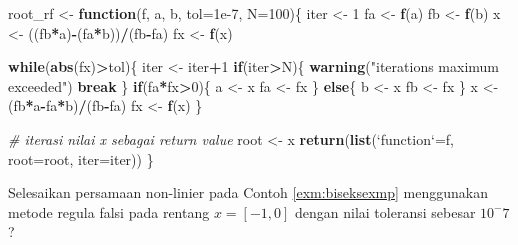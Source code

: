 \documentclass[]{book}
\newenvironment{Shaded}{\begin{snugshade}}{\end{snugshade}}
\newcommand{\CommentTok}[1]{\textcolor[rgb]{0.56,0.35,0.01}{\textit{#1}}}
\newcommand{\ControlFlowTok}[1]{\textcolor[rgb]{0.13,0.29,0.53}{\textbf{#1}}}
\newcommand{\DataTypeTok}[1]{\textcolor[rgb]{0.13,0.29,0.53}{#1}}
\newcommand{\DecValTok}[1]{\textcolor[rgb]{0.00,0.00,0.81}{#1}}
\newcommand{\FloatTok}[1]{\textcolor[rgb]{0.00,0.00,0.81}{#1}}
\newcommand{\KeywordTok}[1]{\textcolor[rgb]{0.13,0.29,0.53}{\textbf{#1}}}
\newcommand{\NormalTok}[1]{#1}
\newcommand{\OperatorTok}[1]{\textcolor[rgb]{0.81,0.36,0.00}{\textbf{#1}}}
\newcommand{\StringTok}[1]{\textcolor[rgb]{0.31,0.60,0.02}{#1}}
\theoremstyle{definition}
\theoremstyle{definition}
\theoremstyle{definition}
\theoremstyle{remark}
\let\BeginKnitrBlock\begin \let\EndKnitrBlock\end
\begin{document}
\begin{Shaded}
\begin{Highlighting}[]
\NormalTok{root_rf <-}\StringTok{ }\ControlFlowTok{function}\NormalTok{(f, a, b, }\DataTypeTok{tol=}\FloatTok{1e-7}\NormalTok{, }\DataTypeTok{N=}\DecValTok{100}\NormalTok{)\{}
\NormalTok{  iter <-}\StringTok{ }\DecValTok{1}
\NormalTok{  fa <-}\StringTok{ }\KeywordTok{f}\NormalTok{(a)}
\NormalTok{  fb <-}\StringTok{ }\KeywordTok{f}\NormalTok{(b)}
\NormalTok{  x <-}\StringTok{ }\NormalTok{((fb}\OperatorTok{*}\NormalTok{a)}\OperatorTok{-}\NormalTok{(fa}\OperatorTok{*}\NormalTok{b))}\OperatorTok{/}\NormalTok{(fb}\OperatorTok{-}\NormalTok{fa)}
\NormalTok{  fx <-}\StringTok{ }\KeywordTok{f}\NormalTok{(x)}
  
  \ControlFlowTok{while}\NormalTok{(}\KeywordTok{abs}\NormalTok{(fx)}\OperatorTok{>}\NormalTok{tol)\{}
\NormalTok{    iter <-}\StringTok{ }\NormalTok{iter}\OperatorTok{+}\DecValTok{1}
    \ControlFlowTok{if}\NormalTok{(iter}\OperatorTok{>}\NormalTok{N)\{}
      \KeywordTok{warning}\NormalTok{(}\StringTok{"iterations maximum exceeded"}\NormalTok{)}
      \ControlFlowTok{break}
\NormalTok{    \}}
    \ControlFlowTok{if}\NormalTok{(fa}\OperatorTok{*}\NormalTok{fx}\OperatorTok{>}\DecValTok{0}\NormalTok{)\{}
\NormalTok{      a <-}\StringTok{ }\NormalTok{x}
\NormalTok{      fa <-}\StringTok{ }\NormalTok{fx}
\NormalTok{    \} }\ControlFlowTok{else}\NormalTok{\{}
\NormalTok{      b <-}\StringTok{ }\NormalTok{x}
\NormalTok{      fb <-}\StringTok{ }\NormalTok{fx}
\NormalTok{    \}}
\NormalTok{    x <-}\StringTok{ }\NormalTok{(fb}\OperatorTok{*}\NormalTok{a}\OperatorTok{-}\NormalTok{fa}\OperatorTok{*}\NormalTok{b)}\OperatorTok{/}\NormalTok{(fb}\OperatorTok{-}\NormalTok{fa)}
\NormalTok{    fx <-}\StringTok{ }\KeywordTok{f}\NormalTok{(x)}
\NormalTok{  \}}
  
  \CommentTok{# iterasi nilai x sebagai return value}
\NormalTok{  root <-}\StringTok{ }\NormalTok{x}
  \KeywordTok{return}\NormalTok{(}\KeywordTok{list}\NormalTok{(}\StringTok{`}\DataTypeTok{function}\StringTok{`}\NormalTok{=f, }\DataTypeTok{root=}\NormalTok{root, }\DataTypeTok{iter=}\NormalTok{iter))}
\NormalTok{\}}
\end{Highlighting}
\end{Shaded}

\BeginKnitrBlock{example}
\protect\hypertarget{exm:rfexmp}{}{\label{exm:rfexmp} }Selesaikan persamaan non-linier pada Contoh \ref{exm:biseksexmp} menggunakan metode regula falsi pada rentang \(x=\left[-1,0 \right]\) dengan nilai toleransi sebesar \(10^-7\)?
\EndKnitrBlock{example}
\end{document}
